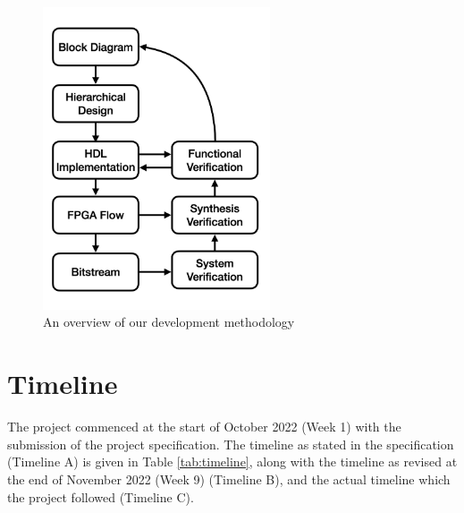 \begin{figure}[H]
    \centering
    \includegraphics[width=0.6\textwidth]{../img/methodology.png}
    \caption{An overview of our development methodology}
    \label{fig:methodology}
\end{figure}


\section{Timeline}
The project commenced at the start of October 2022 (Week 1) with the submission of the project specification. The timeline as stated in the specification (Timeline A) is given in Table \ref{tab:timeline}, along with the timeline as revised at the end of November 2022 (Week 9) (Timeline B), and the actual timeline which the project followed (Timeline C).


